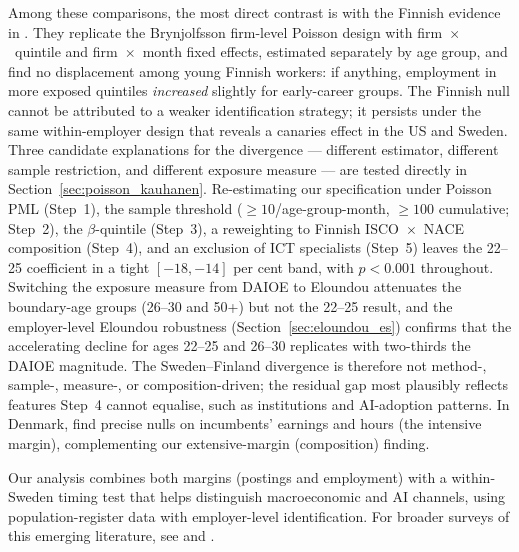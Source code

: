 \documentclass[preprint,12pt,authoryear]{elsarticle}
\begin{document}
Among these comparisons, the most direct contrast is with the Finnish evidence in \citet{kauhanen2026youth}. They replicate the Brynjolfsson firm-level Poisson design with firm~$\times$~quintile and firm~$\times$~month fixed effects, estimated separately by age group, and find no displacement among young Finnish workers: if anything, employment in more exposed quintiles \emph{increased} slightly for early-career groups. The Finnish null cannot be attributed to a weaker identification strategy; it persists under the same within-employer design that reveals a canaries effect in the US and Sweden. Three candidate explanations for the divergence --- different estimator, different sample restriction, and different exposure measure --- are tested directly in Section~\ref{sec:poisson_kauhanen}. Re-estimating our specification under Poisson PML (Step~1), the \citet{brynjolfsson2025canaries} sample threshold ($\geq 10$/age-group-month, $\geq 100$ cumulative; Step~2), the \citet{eloundou2024gpts} $\beta$-quintile (Step~3), a reweighting to Finnish ISCO~$\times$~NACE composition (Step~4), and an exclusion of ICT specialists (Step~5) leaves the 22--25 coefficient in a tight $[-18, -14]$ per cent band, with $p < 0.001$ throughout. Switching the exposure measure from DAIOE to Eloundou attenuates the boundary-age groups (26--30 and 50+) but not the 22--25 result, and the employer-level Eloundou robustness (Section~\ref{sec:eloundou_es}) confirms that the accelerating decline for ages 22--25 and 26--30 replicates with two-thirds the DAIOE magnitude. The Sweden--Finland divergence is therefore not method-, sample-, measure-, or composition-driven; the residual gap most plausibly reflects features Step~4 cannot equalise, such as institutions and AI-adoption patterns. In Denmark, \citet{humlum2025llm} find precise nulls on incumbents' earnings and hours (the intensive margin), complementing our extensive-margin (composition) finding.

Our analysis combines both margins (postings and employment) with a within-Sweden timing test that helps distinguish macroeconomic and AI channels, using population-register data with employer-level identification. For broader surveys of this emerging literature, see \citet{chandar2025aiknow} and \citet{kolko2026firstinning}.
\end{document}
